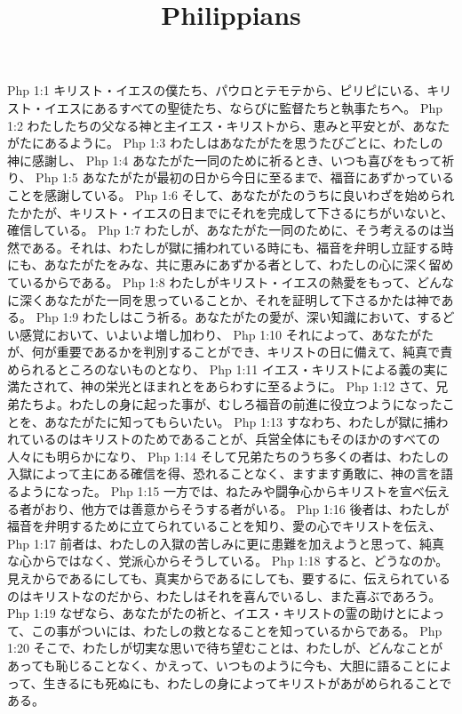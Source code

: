 

\title{Philippians}

Php 1:1  キリスト・イエスの僕たち、パウロとテモテから、ピリピにいる、キリスト・イエスにあるすべての聖徒たち、ならびに監督たちと執事たちへ。
Php 1:2  わたしたちの父なる神と主イエス・キリストから、恵みと平安とが、あなたがたにあるように。
Php 1:3  わたしはあなたがたを思うたびごとに、わたしの神に感謝し、
Php 1:4  あなたがた一同のために祈るとき、いつも喜びをもって祈り、
Php 1:5  あなたがたが最初の日から今日に至るまで、福音にあずかっていることを感謝している。
Php 1:6  そして、あなたがたのうちに良いわざを始められたかたが、キリスト・イエスの日までにそれを完成して下さるにちがいないと、確信している。
Php 1:7  わたしが、あなたがた一同のために、そう考えるのは当然である。それは、わたしが獄に捕われている時にも、福音を弁明し立証する時にも、あなたがたをみな、共に恵みにあずかる者として、わたしの心に深く留めているからである。
Php 1:8  わたしがキリスト・イエスの熱愛をもって、どんなに深くあなたがた一同を思っていることか、それを証明して下さるかたは神である。
Php 1:9  わたしはこう祈る。あなたがたの愛が、深い知識において、するどい感覚において、いよいよ増し加わり、
Php 1:10  それによって、あなたがたが、何が重要であるかを判別することができ、キリストの日に備えて、純真で責められるところのないものとなり、
Php 1:11  イエス・キリストによる義の実に満たされて、神の栄光とほまれとをあらわすに至るように。
Php 1:12  さて、兄弟たちよ。わたしの身に起った事が、むしろ福音の前進に役立つようになったことを、あなたがたに知ってもらいたい。
Php 1:13  すなわち、わたしが獄に捕われているのはキリストのためであることが、兵営全体にもそのほかのすべての人々にも明らかになり、
Php 1:14  そして兄弟たちのうち多くの者は、わたしの入獄によって主にある確信を得、恐れることなく、ますます勇敢に、神の言を語るようになった。
Php 1:15  一方では、ねたみや闘争心からキリストを宣べ伝える者がおり、他方では善意からそうする者がいる。
Php 1:16  後者は、わたしが福音を弁明するために立てられていることを知り、愛の心でキリストを伝え、
Php 1:17  前者は、わたしの入獄の苦しみに更に患難を加えようと思って、純真な心からではなく、党派心からそうしている。
Php 1:18  すると、どうなのか。見えからであるにしても、真実からであるにしても、要するに、伝えられているのはキリストなのだから、わたしはそれを喜んでいるし、また喜ぶであろう。
Php 1:19  なぜなら、あなたがたの祈と、イエス・キリストの霊の助けとによって、この事がついには、わたしの救となることを知っているからである。
Php 1:20  そこで、わたしが切実な思いで待ち望むことは、わたしが、どんなことがあっても恥じることなく、かえって、いつものように今も、大胆に語ることによって、生きるにも死ぬにも、わたしの身によってキリストがあがめられることである。
